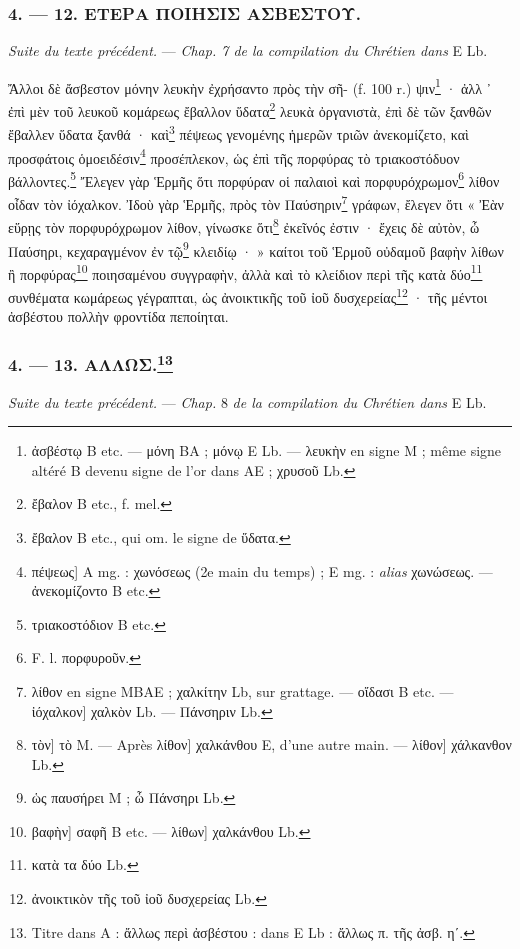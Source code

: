 \documentclass[a4paper, 11pt, oneside, polutonikogreek, french]{article}
\begin{document}
\bigskip
\centerline{\EightStarTaper}
\centerline{\EightStarTaper\EightStarTaper}
\bigskip

\subsubsection{4. --- 12. ΕΤΕΡΑ ΠΟΙΗΣΙΣ ΑΣΒΕΣΤΟΥ.}

\emph{Suite du texte précédent.} --- \emph{Chap. 7 de la compilation du Chrétien dans} E Lb.

Ἄλλοι δὲ ἄσβεστον μόνην λευκὴν ἐχρήσαντο πρὸς τὴν σῆ- (f. 100 r.) ψιν\footnote{ἀσβέστῳ B etc. --- μόνη BA ; μόνῳ E Lb. --- λευκὴν en signe M ; même signe altéré B devenu signe de l'or dans AE ; χρυσοῦ Lb.} · ἀλλ ᾽ ἐπὶ μὲν τοῦ λευκοῦ κομάρεως ἔβαλλον ὕδατα\footnote{ἔβαλον B etc., f. mel.} λευκὰ ὀργανιστὰ, ἐπὶ δὲ τῶν ξανθῶν ἔβαλλεν ὕδατα ξανθά · καὶ\footnote{ἔβαλον B etc., qui om. le signe de ὕδατα.} πέψεως γενομένης ἡμερῶν τριῶν ἀνεκομίζετο, καὶ προσφάτοις ὁμοειδέσιν\footnote{πέψεως] A mg. : χωνόσεως (2e main du temps) ; E mg. : \emph{alias} χωνώσεως. --- ἀνεκομίζοντο B etc.} προσέπλεκον, ὡς ἐπὶ τῆς πορφύρας τὸ τριακοστόδυον βάλλοντες.\footnote{τριακοστόδιον B etc.} Ἔλεγεν γὰρ Ἑρμῆς ὅτι πορφύραν οἱ παλαιοὶ καὶ πορφυρόχρωμον\footnote{F. l. πορφυροῦν.} λίθον οἶδαν τὸν ἰόχαλκον. Ἰδοὺ γὰρ Ἑρμῆς, πρὸς τὸν Παύσηριν\footnote{λίθον en signe MBAE ; χαλκίτην Lb, sur grattage. --- οἴδασι B etc. --- ἰόχαλκον] χαλκὸν Lb. --- Πάνσηριν Lb.} γράφων, ἔλεγεν ὅτι « Ἐὰν εὕρῃς τὸν πορφυρόχρωμον λίθον, γίνωσκε ὅτι\footnote{τὸν] τὸ M. --- Après λίθον] χαλκάνθου E, d'une autre main. --- λίθον] χάλκανθον Lb.} ἐκεῖνός ἐστιν · ἔχεις δὲ αὐτὸν, ὦ Παύσηρι, κεχαραγμένον ἐν τῷ\footnote{ὡς παυσήρει M ; ὦ Πάνσηρι Lb.} κλειδίῳ · » καίτοι τοῦ Ἑρμοῦ οὐδαμοῦ βαφὴν λίθων ἢ πορφύρας\footnote{βαφὴν] σαφῆ B etc. --- λίθων] χαλκάνθου Lb.} ποιησαμένου συγγραφὴν, ἀλλὰ καὶ τὸ κλείδιον περὶ τῆς κατὰ δύο\footnote{κατὰ τα δύο Lb.} συνθέματα κωμάρεως γέγραπται, ὡς ἀνοικτικῆς τοῦ ἰοῦ δυσχερείας\footnote{ἀνοικτικὸν τῆς τοῦ ἰοῦ δυσχερείας Lb.} · τῆς μέντοι ἀσβέστου πολλὴν φροντίδα πεποίηται.

\bigskip
\centerline{\EightStarTaper}
\centerline{\EightStarTaper\EightStarTaper}
\bigskip

\subsubsection[4. --- 13. ΑΛΛΩΣ.]{4. --- 13. ΑΛΛΩΣ.\footnote{Titre dans A : ἄλλως περὶ ἀσβέστου : dans E Lb : ἄλλως π. τῆς ἀσβ. ηʹ.}}

\emph{Suite du texte précédent.} --- \emph{Chap.} 8 \emph{de la compilation du Chrétien dans} E Lb.
\end{document}
